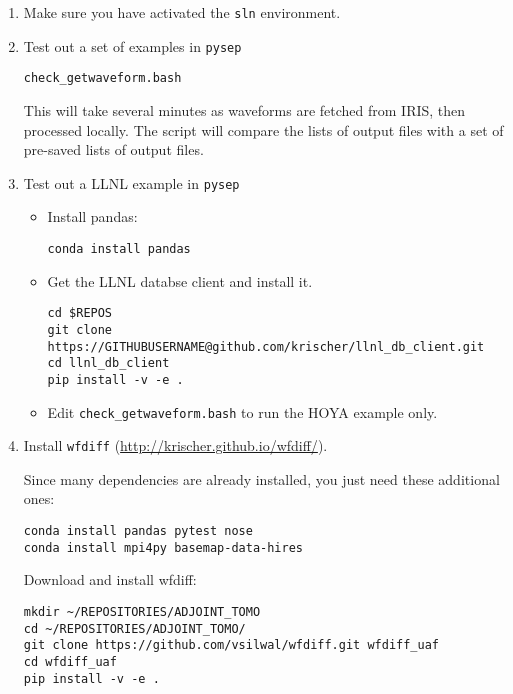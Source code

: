 \documentclass[10pt,titlepage,fleqn]{article}
\begin{document}
\begin{enumerate}
\item Make sure you have activated the \verb+sln+ environment.

\item Test out a set of examples in \verb+pysep+
%
\begin{verbatim}
check_getwaveform.bash
\end{verbatim}
%
This will take several minutes as waveforms are fetched from IRIS, then processed locally. The script will compare the lists of output files with a set of pre-saved lists of output files.

\item Test out a LLNL example in \verb+pysep+
%
\begin{itemize}
\item Install pandas:
%
\begin{verbatim}
conda install pandas
\end{verbatim}

\item Get the LLNL databse client and install it.
%
\begin{verbatim}
cd $REPOS
git clone https://GITHUBUSERNAME@github.com/krischer/llnl_db_client.git
cd llnl_db_client
pip install -v -e .
\end{verbatim}

\item Edit \verb+check_getwaveform.bash+ to run the HOYA example only.

\end{itemize}

\iffalse
\item Install \verb+wfdiff+ (\url{http://krischer.github.io/wfdiff/}).

Since many dependencies are already installed, you just need these additional ones:
%
\begin{verbatim}
conda install pandas pytest nose
conda install mpi4py basemap-data-hires
\end{verbatim}
%
%
%
%
%
%
Download and install wfdiff:
%
\begin{verbatim}
mkdir ~/REPOSITORIES/ADJOINT_TOMO
cd ~/REPOSITORIES/ADJOINT_TOMO/
git clone https://github.com/vsilwal/wfdiff.git wfdiff_uaf
cd wfdiff_uaf
pip install -v -e .
\end{verbatim}


\end{enumerate}
\end{document}
